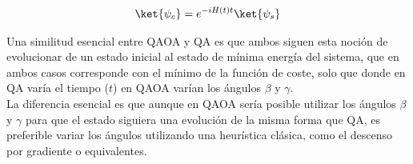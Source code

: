 \begin{align*}
  \ket{\psi_c} = e^{-i H(t) t}\ket{\psi_s}
\end{align*}

Una similitud esencial entre QAOA y QA es que ambos siguen esta noción de evolucionar de un estado inicial al estado de mínima energía del sistema, que en ambos casos corresponde con el mínimo de la función de coste, solo que donde en QA varía el tiempo ($t$) en QAOA varían los ángulos $\beta$ y $\gamma$.
\\
La diferencia esencial es que aunque en QAOA sería posible utilizar los ángulos $\beta$ y $\gamma$ para que el estado siguiera una evolución de la misma forma que QA, es preferible variar los ángulos utilizando una heurística clásica, como el descenso por gradiente o equivalentes.


